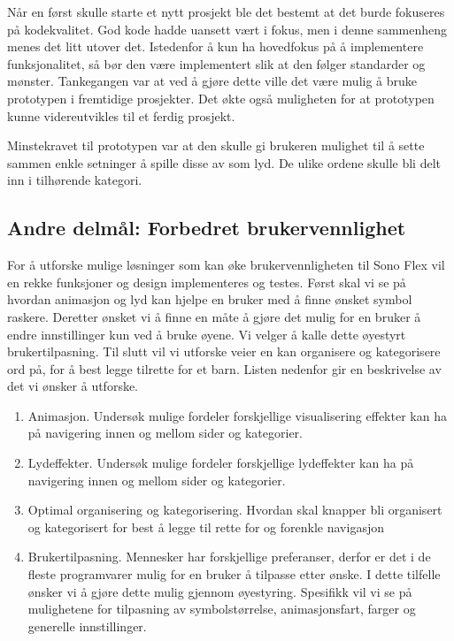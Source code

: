 Når en først skulle starte et nytt prosjekt ble det bestemt at det burde fokuseres på kodekvalitet. God kode hadde uansett vært i fokus, men i denne sammenheng menes det litt utover det. Istedenfor å kun ha hovedfokus på å implementere funksjonalitet, så bør den være implementert slik at den følger standarder og mønster. Tankegangen var at ved å gjøre dette ville det være mulig å bruke prototypen i fremtidige prosjekter. Det økte også muligheten for at prototypen kunne videreutvikles til et ferdig prosjekt. 

Minstekravet til prototypen var at den skulle gi brukeren mulighet til å sette sammen enkle setninger å spille disse av som lyd. De ulike ordene skulle bli delt inn i tilhørende kategori. 


\subsection{Andre delmål: Forbedret brukervennlighet}
\label{sec:ResearchQuestion}

For å utforske mulige løsninger som kan øke brukervennligheten til Sono Flex vil en rekke funksjoner og design implementeres og testes. Først skal vi se på hvordan animasjon og lyd kan hjelpe en bruker med å finne ønsket symbol raskere. Deretter ønsket vi å finne en måte å gjøre det mulig for en bruker å endre innstillinger kun ved å bruke øyene. Vi velger å kalle dette øyestyrt brukertilpasning. Til slutt vil vi utforske veier en kan organisere og kategorisere ord på, for å best legge tilrette for et barn. Listen nedenfor gir en  beskrivelse av det vi ønsker å utforske.

\begin{enumerate} 
\label{lst:features}
\item Animasjon. Undersøk mulige fordeler forskjellige visualisering effekter kan ha på navigering innen og mellom sider og kategorier.
\item Lydeffekter. Undersøk mulige fordeler forskjellige lydeffekter kan ha på navigering innen og mellom sider og kategorier.
\item Optimal organisering og kategorisering. Hvordan skal knapper bli organisert og kategorisert for best å legge til rette for og forenkle navigasjon
\item Brukertilpasning. Mennesker har forskjellige preferanser, derfor er det i de fleste programvarer mulig for en bruker å tilpasse etter ønske. I dette tilfelle ønsker vi å gjøre dette mulig gjennom øyestyring. Spesifikk vil vi se på mulighetene for tilpasning av symbolstørrelse, animasjonsfart, farger og generelle innstillinger. 
\end{enumerate}

